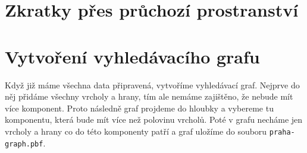 \section{Zkratky přes průchozí prostranství}

\section{Vytvoření vyhledávacího grafu}
Když již máme všechna data připravená, vytvoříme vyhledávací graf. Nejprve do
něj přidáme všechny vrcholy a hrany, tím ale nemáme zajištěno, že nebude mít
více komponent. Proto následně graf projdeme do hloubky a vybereme tu
komponentu, která bude mít více než polovinu vrcholů. Poté v grafu necháme jen
vrcholy a hrany co do této komponenty patří a graf uložíme do souboru
\verb|praha-graph.pbf|. 
